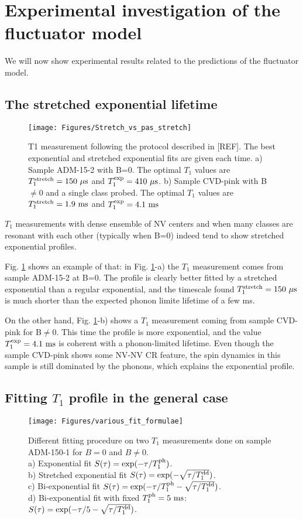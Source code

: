 \documentclass[a4paper,11pt]{report}
\begin{document}
\section{Experimental investigation of the fluctuator model}
We will now show experimental results related to the predictions of the fluctuator model.
\subsection{The stretched exponential lifetime}
\begin{figure}[h]
\centering
\texttt{[image: Figures/Stretch\_vs\_pas\_stretch]}
\caption{T1 measurement following the protocol described in [REF]. The best exponential and stretched exponential fits are given each time. a) Sample ADM-15-2 with B=0. The optimal $T_1$ values are $T_1^{\rm stretch}=150\ \mu \rm s$ and $T_1^{\rm exp}=410\ \mu \rm s$. b) Sample CVD-pink with B$\neq$0 and a single class probed. The optimal $T_1$ values are $T_1^{\rm stretch}=1.9\ \rm ms$ and $T_1^{\rm exp}=4.1\ \rm ms$}
\label{stretch_or_not_stretch}
\end{figure}
$T_1$ measurements with dense ensemble of NV centers and when many classes are resonant with each other (typically when B=0) indeed tend to show stretched exponential profiles.

Fig. \ref{stretch_or_not_stretch} shows an example of that: in Fig. \ref{stretch_or_not_stretch}-a) the $T_1$ measurement comes from sample ADM-15-2 at B=0. The profile is clearly better fitted by a stretched exponential than a regular exponential, and the timescale found $T_1^{\rm stretch}=150\ \mu \rm s$ is much shorter than the expected phonon limite lifetime of a few ms.

On the other hand, Fig. \ref{stretch_or_not_stretch}-b) shows a $T_1$ measurement coming from sample CVD-pink for B$\neq$0. This time the profile is more exponential, and the value $T_1^{\rm exp}=4.1\ \rm ms$ is coherent with a phonon-limited lifetime. Even though the sample CVD-pink shows some NV-NV CR feature, the spin dynamics in this sample is still dominated by the phonons, which explains the exponential profile.


\subsection{Fitting $T_1$ profile in the general case}

\begin{figure}[h]
\centering
\texttt{[image: Figures/various\_fit\_formulae]}
\caption{Different fitting procedure on two $T_1$ measurements done on sample ADM-150-1 for $B=0$ and $B\neq0$. \\ a) Exponential fit $S(\tau)=\exp (-\tau/T_1^{\rm ph})$. \\ b) Stretched exponential fit $S(\tau)=\exp (-\sqrt{\tau/T_1^{\rm dd}})$. \\ c) Bi-exponential fit $S(\tau)=\exp (-\tau/T_1^{\rm ph} -\sqrt{\tau/T_1^{\rm dd}})$. \\ d) Bi-exponential fit with fixed $T_1^{\rm ph}=5\ \rm ms$: $S(\tau)=\exp (-\tau/5 -\sqrt{\tau/T_1^{\rm dd}})$.}
\label{various_fit_formulae}
\end{figure}
\end{document}
